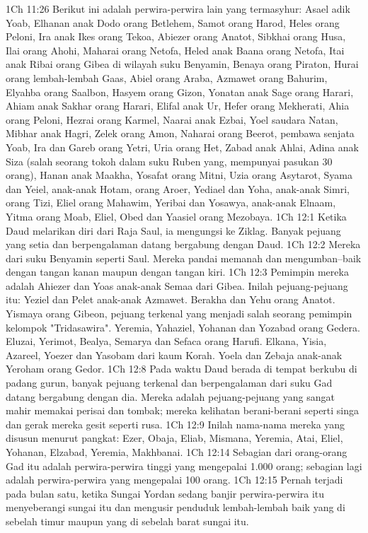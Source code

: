 1Ch 11:26  Berikut ini adalah perwira-perwira lain yang termasyhur: Asael adik Yoab, Elhanan anak Dodo orang Betlehem, Samot orang Harod, Heles orang Peloni, Ira anak Ikes orang Tekoa, Abiezer orang Anatot, Sibkhai orang Husa, Ilai orang Ahohi, Maharai orang Netofa, Heled anak Baana orang Netofa, Itai anak Ribai orang Gibea di wilayah suku Benyamin, Benaya orang Piraton, Hurai orang lembah-lembah Gaas, Abiel orang Araba, Azmawet orang Bahurim, Elyahba orang Saalbon, Hasyem orang Gizon, Yonatan anak Sage orang Harari, Ahiam anak Sakhar orang Harari, Elifal anak Ur, Hefer orang Mekherati, Ahia orang Peloni, Hezrai orang Karmel, Naarai anak Ezbai, Yoel saudara Natan, Mibhar anak Hagri, Zelek orang Amon, Naharai orang Beerot, pembawa senjata Yoab, Ira dan Gareb orang Yetri, Uria orang Het, Zabad anak Ahlai, Adina anak Siza (salah seorang tokoh dalam suku Ruben yang, mempunyai pasukan 30 orang), Hanan anak Maakha, Yosafat orang Mitni, Uzia orang Asytarot, Syama dan Yeiel, anak-anak Hotam, orang Aroer, Yediael dan Yoha, anak-anak Simri, orang Tizi, Eliel orang Mahawim, Yeribai dan Yosawya, anak-anak Elnaam, Yitma orang Moab, Eliel, Obed dan Yaasiel orang Mezobaya.
1Ch 12:1  Ketika Daud melarikan diri dari Raja Saul, ia mengungsi ke Ziklag. Banyak pejuang yang setia dan berpengalaman datang bergabung dengan Daud.
1Ch 12:2  Mereka dari suku Benyamin seperti Saul. Mereka pandai memanah dan mengumban--baik dengan tangan kanan maupun dengan tangan kiri.
1Ch 12:3  Pemimpin mereka adalah Ahiezer dan Yoas anak-anak Semaa dari Gibea. Inilah pejuang-pejuang itu: Yeziel dan Pelet anak-anak Azmawet. Berakha dan Yehu orang Anatot. Yismaya orang Gibeon, pejuang terkenal yang menjadi salah seorang pemimpin kelompok "Tridasawira". Yeremia, Yahaziel, Yohanan dan Yozabad orang Gedera. Eluzai, Yerimot, Bealya, Semarya dan Sefaca orang Harufi. Elkana, Yisia, Azareel, Yoezer dan Yasobam dari kaum Korah. Yoela dan Zebaja anak-anak Yeroham orang Gedor.
1Ch 12:8  Pada waktu Daud berada di tempat berkubu di padang gurun, banyak pejuang terkenal dan berpengalaman dari suku Gad datang bergabung dengan dia. Mereka adalah pejuang-pejuang yang sangat mahir memakai perisai dan tombak; mereka kelihatan berani-berani seperti singa dan gerak mereka gesit seperti rusa.
1Ch 12:9  Inilah nama-nama mereka yang disusun menurut pangkat: Ezer, Obaja, Eliab, Mismana, Yeremia, Atai, Eliel, Yohanan, Elzabad, Yeremia, Makhbanai.
1Ch 12:14  Sebagian dari orang-orang Gad itu adalah perwira-perwira tinggi yang mengepalai 1.000 orang; sebagian lagi adalah perwira-perwira yang mengepalai 100 orang.
1Ch 12:15  Pernah terjadi pada bulan satu, ketika Sungai Yordan sedang banjir perwira-perwira itu menyeberangi sungai itu dan mengusir penduduk lembah-lembah baik yang di sebelah timur maupun yang di sebelah barat sungai itu.

